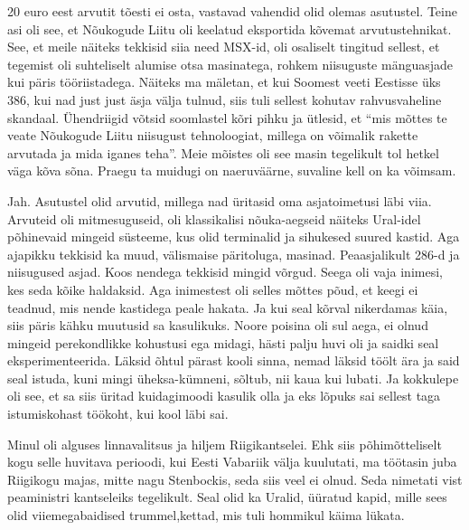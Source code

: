 
20 euro eest arvutit tõesti ei osta, vastavad vahendid olid olemas asutustel. 
Teine asi oli see, et Nõukogude Liitu oli keelatud eksportida kõvemat 
arvutustehnikat. See, et meile näiteks tekkisid siia need MSX-id, oli osaliselt 
tingitud sellest, et tegemist oli suhteliselt alumise otsa masinatega,  rohkem 
niisuguste mänguasjade kui  päris tööriistadega. Näiteks ma mäletan, et kui 
Soomest veeti Eestisse üks 386, kui nad just just äsja välja tulnud,  siis tuli 
sellest kohutav rahvusvaheline skandaal. Ühendriigid võtsid soomlastel kõri 
pihku ja ütlesid, et \enquote{mis mõttes te veate Nõukogude Liitu niisugust 
tehnoloogiat, millega on võimalik rakette arvutada ja mida iganes teha}. Meie 
mõistes oli see masin tegelikult tol hetkel väga kõva sõna. Praegu ta muidugi 
on naeruväärne, suvaline kell on ka võimsam.


Jah. Asutustel olid arvutid, millega nad üritasid oma asjatoimetusi läbi viia.
Arvuteid oli mitmesuguseid, oli klassikalisi nõuka-aegseid näiteks Ural-idel 
põhinevaid mingeid süsteeme, kus olid terminalid ja sihukesed suured kastid.
Aga ajapikku tekkisid ka muud, välismaise päritoluga, masinad. Peaasjalikult 
286-d ja niisugused asjad. Koos nendega tekkisid mingid võrgud. Seega oli vaja 
inimesi, kes seda kõike haldaksid. Aga inimestest oli selles mõttes põud, et 
keegi ei teadnud, mis nende kastidega peale hakata. Ja kui seal kõrval 
nikerdamas käia, siis päris kähku muutusid sa kasulikuks. Noore poisina oli sul 
aega, ei olnud mingeid perekondlikke kohustusi ega midagi, hästi palju huvi oli 
ja saidki seal eksperimenteerida. Läksid õhtul pärast kooli sinna, nemad läksid 
töölt ära ja said seal istuda, kuni mingi üheksa-kümneni, sõltub, nii kaua kui 
lubati. Ja kokkulepe oli see, et sa siis üritad kuidagimoodi kasulik olla ja 
eks lõpuks sai sellest taga istumiskohast töökoht, kui kool läbi sai.

        
Minul oli alguses linnavalitsus ja hiljem 
Riigikantselei. Ehk siis põhimõtteliselt kogu selle 
huvitava perioodi, kui Eesti Vabariik välja kuulutati, ma töötasin juba 
Riigikogu majas, mitte nagu Stenbockis, seda siis veel ei olnud. Seda nimetati 
vist peaministri kantseleiks tegelikult. Seal olid ka 
Uralid, 
üüratud kapid, mille sees olid viiemegabaidised trummel,kettad, mis tuli 
hommikul käima lükata.

